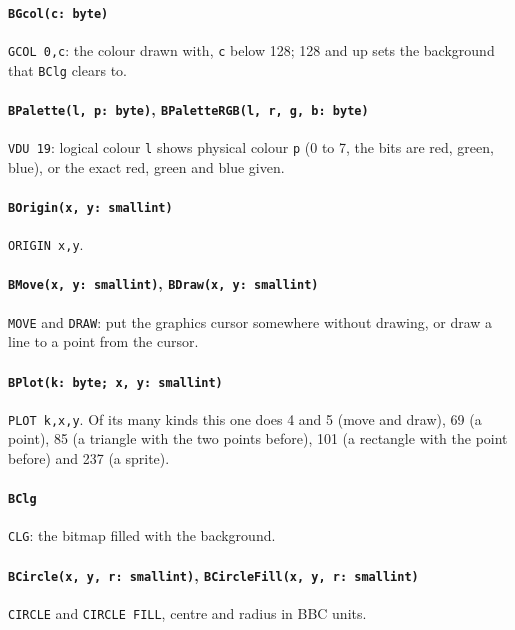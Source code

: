 \paragraph{\texttt{BGcol(c: byte)}} \verb|GCOL 0,c|: the colour drawn with,
\verb|c| below 128; 128 and up sets the background that \verb|BClg| clears
to.

\paragraph{\texttt{BPalette(l, p: byte)}, \texttt{BPaletteRGB(l, r, g, b: byte)}}
\verb|VDU 19|: logical colour \verb|l| shows physical colour \verb|p| (0 to 7,
the bits are red, green, blue), or the exact red, green and blue given.

\paragraph{\texttt{BOrigin(x, y: smallint)}} \verb|ORIGIN x,y|.

\paragraph{\texttt{BMove(x, y: smallint)}, \texttt{BDraw(x, y: smallint)}}
\verb|MOVE| and \verb|DRAW|: put the graphics cursor somewhere without
drawing, or draw a line to a point from the cursor.

\paragraph{\texttt{BPlot(k: byte; x, y: smallint)}} \verb|PLOT k,x,y|. Of its
many kinds this one does 4 and 5 (move and draw), 69 (a point), 85 (a triangle
with the two points before), 101 (a rectangle with the point before) and 237
(a sprite).

\paragraph{\texttt{BClg}} \verb|CLG|: the bitmap filled with the background.

\paragraph{\texttt{BCircle(x, y, r: smallint)}, \texttt{BCircleFill(x, y, r: smallint)}}
\verb|CIRCLE| and \verb|CIRCLE FILL|, centre and radius in BBC units.

